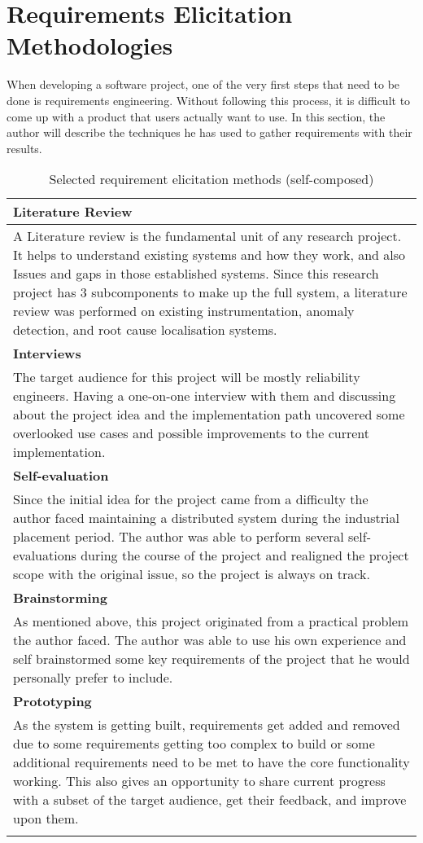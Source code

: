 \section{Requirements Elicitation Methodologies}

When developing a software project, one of the very first steps that need to be done is requirements engineering. Without following this process, it is difficult to come up with a product that users actually want to use. In this section, the author will describe the techniques he has used to gather requirements with their results.

\newpage

\begin{longtable}{|p{160mm}|}
\hline
\textbf{Literature Review} \\ \hline
A Literature review is the fundamental unit of any research project. It helps to understand existing systems and how they work, and also Issues and gaps in those established systems. Since this research project has 3 subcomponents to make up the full system, a literature review was performed on existing instrumentation, anomaly detection, and root cause localisation systems. \\ \hline

\textbf{Interviews} \\ \hline
The target audience for this project will be mostly reliability engineers. Having a one-on-one interview with them and discussing about the project idea and the implementation path uncovered some overlooked use cases and possible improvements to the current implementation. \\ \hline


\textbf{Self-evaluation} \\ \hline
Since the initial idea for the project came from a difficulty the author faced maintaining a distributed system during the industrial placement period. The author was able to perform several self-evaluations during the course of the project and realigned the project scope with the original issue, so the project is always on track. \\ \hline

\textbf{Brainstorming} \\ \hline
As mentioned above, this project originated from a practical problem the author faced. The author was able to use his own experience and self brainstormed some key requirements of the project that he would personally prefer to include. \\ \hline

\textbf{Prototyping} \\ \hline
As the system is getting built, requirements get added and removed due to some requirements getting too complex to build or some additional requirements need to be met to have the core functionality working. This also gives an opportunity to share current progress with a subset of the target audience, get their feedback, and improve upon them. \\ \hline

\caption{Selected requirement elicitation methods (self-composed)}
\end{longtable}

